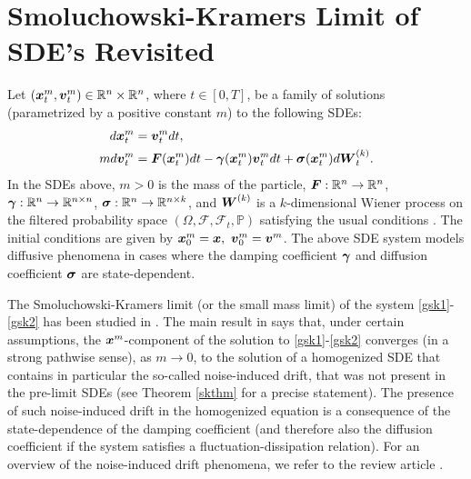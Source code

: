 


\section{Smoluchowski-Kramers Limit of SDE's  Revisited} \label{skrevisited}
Let $(\boldsymbol{x}_{t}^m, \boldsymbol{v}^m_{t}) \in \mathbb{R}^{n} \times \mathbb{R}^n$, where $t \in [0,T]$, be a family of solutions (parametrized by a positive constant $m$) to the following SDEs:
\begin{align}
d\boldsymbol{x}^m_{t} &= \boldsymbol{v}^m_{t} dt,  \label{gsk1} \\ 
m d\boldsymbol{v}^m_{t} &= \boldsymbol{F}(\boldsymbol{x}^m_{t}) dt -\boldsymbol{\gamma}(\boldsymbol{x}^m_{t}) \boldsymbol{v}^m_{t} dt  + \boldsymbol{\sigma}(\boldsymbol{x}^m_{t}) d\boldsymbol{W}^{(k)}_{t}.\label{gsk2}
\end{align}
In the SDEs above,  $m > 0$ is the mass of the particle, $\boldsymbol{F}: \mathbb{R}^{n} \to \mathbb{R}^{n}$, $\boldsymbol{\gamma}: \mathbb{R}^{n} \to \mathbb{R}^{n \times n}$, $\boldsymbol{\sigma}: \mathbb{R}^{n} \to \mathbb{R}^{n \times k}$, and $\boldsymbol{W}^{(k)}$ is a $k$-dimensional Wiener process on the filtered probability space $(\Omega, \mathcal{F}, \mathcal{F}_{t}, \mathbb{P})$ satisfying the usual conditions \citep{karatzas2012Brownian}. 
The initial conditions are given by $\vecc{x}^m_{0} = \vecc{x}, \ \vecc{v}^m_{0} = \vecc{v}^m$. The above SDE system models diffusive phenomena in cases where the damping coefficient $\boldsymbol{\gamma}$ and diffusion coefficient $\boldsymbol{\sigma}$ are state-dependent. 

The Smoluchowski-Kramers limit (or the small mass limit) of the system \eqref{gsk1}-\eqref{gsk2}  has been studied in \citep{hottovy2015smoluchowski, Hottovy12, Herzog2016, birrell2017small,birrell2017homogenization}. The main result in \citep{birrell2017homogenization} says that, under certain assumptions, the $\boldsymbol{x}^m$-component of the solution to \eqref{gsk1}-\eqref{gsk2} converges (in a strong pathwise sense), as $m \to 0$, to the solution of a homogenized SDE that contains in particular the so-called noise-induced drift, that was not present in the pre-limit SDEs (see Theorem \ref{skthm} for a precise statement). The presence of such noise-induced drift in the homogenized equation is a consequence of the state-dependence of the damping coefficient (and therefore also the diffusion coefficient if the system satisfies a fluctuation-dissipation relation). For an overview of the noise-induced drift phenomena, we refer to the review article \citep{volpe2016effective}.  


